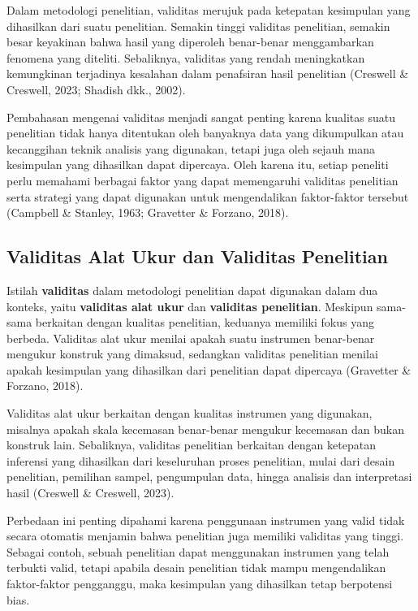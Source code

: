 \documentclass[
  indonesian,
  letterpaper,
  DIV=11,
  numbers=noendperiod]{scrreprt}
\begin{document}
Dalam metodologi penelitian, validitas merujuk pada ketepatan kesimpulan
yang dihasilkan dari suatu penelitian. Semakin tinggi validitas
penelitian, semakin besar keyakinan bahwa hasil yang diperoleh
benar-benar menggambarkan fenomena yang diteliti. Sebaliknya, validitas
yang rendah meningkatkan kemungkinan terjadinya kesalahan dalam
penafsiran hasil penelitian (Creswell \& Creswell, 2023; Shadish dkk.,
2002).

Pembahasan mengenai validitas menjadi sangat penting karena kualitas
suatu penelitian tidak hanya ditentukan oleh banyaknya data yang
dikumpulkan atau kecanggihan teknik analisis yang digunakan, tetapi juga
oleh sejauh mana kesimpulan yang dihasilkan dapat dipercaya. Oleh karena
itu, setiap peneliti perlu memahami berbagai faktor yang dapat
memengaruhi validitas penelitian serta strategi yang dapat digunakan
untuk mengendalikan faktor-faktor tersebut (Campbell \& Stanley, 1963;
Gravetter \& Forzano, 2018).

\subsection{Validitas Alat Ukur dan Validitas
Penelitian}\label{validitas-alat-ukur-dan-validitas-penelitian}

Istilah \textbf{validitas} dalam metodologi penelitian dapat digunakan
dalam dua konteks, yaitu \textbf{validitas alat ukur} dan
\textbf{validitas penelitian}. Meskipun sama-sama berkaitan dengan
kualitas penelitian, keduanya memiliki fokus yang berbeda. Validitas
alat ukur menilai apakah suatu instrumen benar-benar mengukur konstruk
yang dimaksud, sedangkan validitas penelitian menilai apakah kesimpulan
yang dihasilkan dari penelitian dapat dipercaya (Gravetter \& Forzano,
2018).

Validitas alat ukur berkaitan dengan kualitas instrumen yang digunakan,
misalnya apakah skala kecemasan benar-benar mengukur kecemasan dan bukan
konstruk lain. Sebaliknya, validitas penelitian berkaitan dengan
ketepatan inferensi yang dihasilkan dari keseluruhan proses penelitian,
mulai dari desain penelitian, pemilihan sampel, pengumpulan data, hingga
analisis dan interpretasi hasil (Creswell \& Creswell, 2023).

Perbedaan ini penting dipahami karena penggunaan instrumen yang valid
tidak secara otomatis menjamin bahwa penelitian juga memiliki validitas
yang tinggi. Sebagai contoh, sebuah penelitian dapat menggunakan
instrumen yang telah terbukti valid, tetapi apabila desain penelitian
tidak mampu mengendalikan faktor-faktor pengganggu, maka kesimpulan yang
dihasilkan tetap berpotensi bias.
\end{document}
